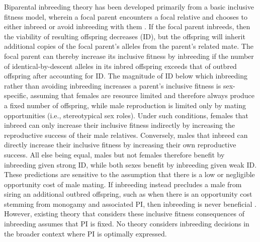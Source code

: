 \documentclass[12pt]{article}
\begin{document}
Biparental inbreeding theory has been developed primarily from a basic inclusive fitness model, wherein a focal parent encounters a focal relative and chooses to either inbreed or avoid inbreeding with them \cite[e.g.,][]{Parker1979, Parker2006, Kokko2006, Duthie2015a}. If the focal parent inbreeds, then the viability of resulting offspring decreases (ID), but the offspring will inherit additional copies of the focal parent's alleles from the parent's related mate. The focal parent can thereby increase its inclusive fitness by inbreeding if the number of identical-by-descent alleles in its inbred offspring exceeds that of outbred offspring after accounting for ID. The magnitude of ID below which inbreeding rather than avoiding inbreeding increases a parent's inclusive fitness is sex-specific, assuming that females are resource limited and therefore always produce a fixed number of offspring, while male reproduction is limited only by mating opportunities (i.e., stereotypical sex roles). Under such conditions, females that inbreed can only increase their inclusive fitness indirectly by increasing the reproductive success of their male relatives. Conversely, males that inbreed can directly increase their inclusive fitness by increasing their own reproductive success. All else being equal, males but not females therefore benefit by inbreeding given strong ID, while both sexes benefit by inbreeding given weak ID. These predictions are sensitive to the assumption that there is a low or negligible opportunity cost of male mating. If inbreeding instead precludes a male from siring an additional outbred offspring, such as when there is an opportunity cost stemming from monogamy and associated PI, then inbreeding is never beneficial \cite[][]{Waser1986}. However, existing theory that considers these inclusive fitness consequences of inbreeding assumes that PI is fixed. No theory considers inbreeding decisions in the broader context where PI is optimally expressed.
\end{document}

